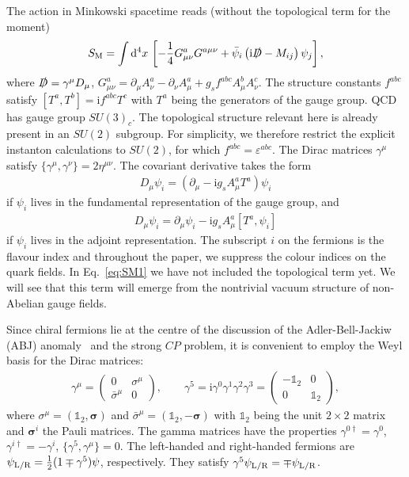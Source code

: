 \documentclass[review]{elsarticle}
\numberwithin{equation}{section}
\numberwithin{table}{section}
\numberwithin{figure}{section}
\def\d{\mathrm{d}}
\def\vec{\bm}
\def\i{\mathrm{i}}
\begin{document}
The action in Minkowski spacetime reads (without the topological term for the moment)
\begin{align}
    S_{\rm M} = \int\d^4x\, \left[-\frac{1}{4}G^a_{\mu\nu}G^{a\mu\nu }+\bar{\psi}_i\left(\i\slashed{D}-M_{ij}\right)\psi_j\right],
    \label{eq:SM1}
\end{align}
where $\slashed{D}=\gamma^\mu D_\mu$, $G^a_{\mu\nu}=\partial_\mu A^a_\nu-\partial_\nu A_\mu^a+g_s f^{abc}A^b_\mu A^c_\nu$. The structure constants $f^{abc}$ satisfy $[T^a,T^b]=\i f^{abc}T^c$ with
$T^a$ being the generators of the gauge group. QCD has gauge group $SU(3)_c$. The topological structure relevant here is already present in an $SU(2)$ subgroup. For simplicity, we therefore restrict the explicit instanton calculations to $SU(2)$, for which $f^{abc}=\varepsilon^{abc}$. The Dirac matrices $\gamma^\mu$ satisfy $\{\gamma^\mu,\gamma^\nu\}=2\eta^{\mu\nu}$. The covariant derivative takes the form
\begin{align}
    D_\mu\psi_i = \left(\partial_\mu-\i g_s A_\mu^a T^a\right)\psi_i
\end{align}
if $\psi_i$ lives in the fundamental representation of the gauge group, and 
\begin{align}
D_\mu\psi_i=\partial_\mu\psi_i-\i g_s A_\mu^a[T^a,\psi_i]
\end{align}
if $\psi_i$ lives in the adjoint representation. The subscript $i$ on the fermions is the flavour index and throughout the paper, we suppress the colour indices on the quark fields.  In Eq.~\eqref{eq:SM1} we have not included the topological term yet. We will see that this term will emerge from the nontrivial vacuum structure of non-Abelian gauge fields.

Since chiral fermions lie at the centre of the discussion of the Adler-Bell-Jackiw (ABJ) anomaly~\cite{Bell:1969ts,Adler:1969gk} and the strong $CP$ problem, it is convenient to employ the Weyl basis for the Dirac matrices:
\begin{align}
    \gamma^\mu
    = 
    \begin{pmatrix}
    0 & \sigma^\mu \\
    \bar{\sigma}^\mu & 0
    \end{pmatrix},
    \qquad 
    \gamma^5=\i\gamma^0\gamma^1\gamma^2\gamma^3
    =\begin{pmatrix}
    -\mathbb{1}_2 & 0\\
    0 & \mathbb{1}_2
    \end{pmatrix},
\end{align}
where $\sigma^\mu=\left(\mathbb{1}_2,\vec{\sigma}\right)$ and $\bar{\sigma}^\mu=(\mathbb{1}_2,-\vec{\sigma})$ with $\mathbb{1}_2$ being the unit $2\times 2$ matrix and $\vec{\sigma}^i$ the Pauli matrices. The gamma matrices have the properties $\gamma^{0\dagger}=\gamma^0$, $\gamma^{i\dagger}=-\gamma^i$, $\{\gamma^5,\gamma^\mu\}=0$. The left-handed and right-handed fermions are $\psi_{\rm L/R}=\frac{1}{2}(1\mp \gamma^5)\psi$, respectively. They satisfy $\gamma^5\psi_{\rm L/R}=\mp \psi_{\rm L/R}$.
\end{document}
